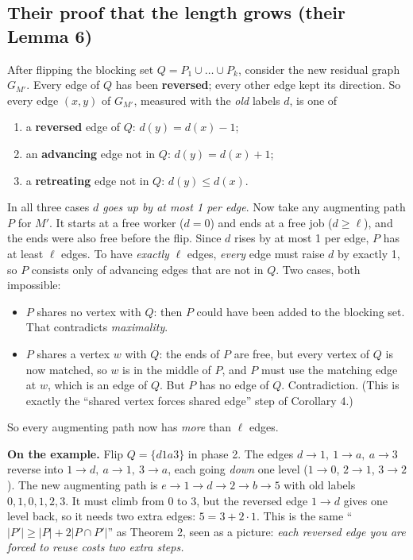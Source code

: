 \documentclass[11pt,a4paper]{article}
\begin{document}
\subsection*{Their proof that the length grows (their Lemma 6)}
After flipping the blocking set $Q=P_1\cup\dots\cup P_k$, consider the new residual graph $G_{M'}$. Every edge of $Q$ has been \textbf{reversed}; every other edge kept its direction. So every edge $(x,y)$ of $G_{M'}$, measured with the \emph{old} labels $d$, is one of
\begin{enumerate}
  \item a \textbf{reversed} edge of $Q$: $d(y)=d(x)-1$;
  \item an \textbf{advancing} edge not in $Q$: $d(y)=d(x)+1$;
  \item a \textbf{retreating} edge not in $Q$: $d(y)\le d(x)$.
\end{enumerate}
In all three cases \emph{$d$ goes up by at most 1 per edge}. Now take any augmenting path $P$ for $M'$. It starts at a free worker ($d=0$) and ends at a free job ($d\ge\ell$), and the ends were also free before the flip. Since $d$ rises by at most 1 per edge, $P$ has at least $\ell$ edges. To have \emph{exactly} $\ell$ edges, \emph{every} edge must raise $d$ by exactly 1, so $P$ consists only of advancing edges that are not in $Q$. Two cases, both impossible:
\begin{itemize}
  \item $P$ shares no vertex with $Q$: then $P$ could have been added to the blocking set. That contradicts \emph{maximality}.
  \item $P$ shares a vertex $w$ with $Q$: the ends of $P$ are free, but every vertex of $Q$ is now matched, so $w$ is in the middle of $P$, and $P$ must use the matching edge at $w$, which is an edge of $Q$. But $P$ has no edge of $Q$. Contradiction. (This is exactly the ``shared vertex forces shared edge'' step of Corollary 4.)
\end{itemize}
So every augmenting path now has \emph{more} than $\ell$ edges.

\textbf{On the example.} Flip $Q=\{d1a3\}$ in phase 2. The edges $d\!\to\!1,\ 1\!\to\!a,\ a\!\to\!3$ reverse into $1\!\to\!d,\ a\!\to\!1,\ 3\!\to\!a$, each going \emph{down} one level ($1\to0$, $2\to1$, $3\to2$). The new augmenting path is $e\to1\to d\to2\to b\to5$ with old labels $0,1,0,1,2,3$. It must climb from 0 to 3, but the reversed edge $1\!\to\!d$ gives one level back, so it needs two extra edges: $5=3+2\cdot1$. This is the same ``$|P'|\ge|P|+2|P\cap P'|$'' as Theorem 2, seen as a picture: \emph{each reversed edge you are forced to reuse costs two extra steps.}
\end{document}

